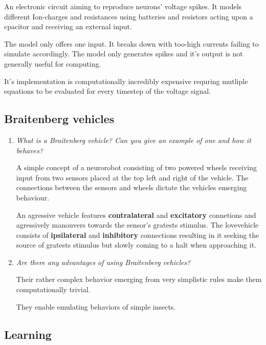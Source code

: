 \documentclass[
    fontsize      = 11pt,
    paper         = a4,
    twoside       = false,
    parskip       = half,
    pagesize      = false,
]{scrartcl}
\begin{document}
\begin{enumerate}
  An electronic circuit aiming to reproduce neurons' voltage spikes. It
  models different Ion-charges and resistances using batteries and
  resistors acting upon a cpacitor and receiving an external input.

  The model only offers one input. It breaks down with too-high currents
  failing to simulate accordingly. The model only generates spikes and
  it's output is not generally useful for computing.

  It's implementation is computationally incredibly expensive requring
  mutliple equations to be evaluated for every timestep of the voltage
  signal.
\end{enumerate}

\hypertarget{braitenberg-vehicles}{%
\subsection{Braitenberg vehicles}\label{braitenberg-vehicles}}

\begin{enumerate}
\def\labelenumi{\arabic{enumi}.}
\item
  \emph{What is a Braitenberg vehicle? Can you give an example of one
  and how it behaves?}

  A simple concept of a neurorobot consisting of two powered wheels
  receiving input from two sensors placed at the top left and right of
  the vehicle. The connections between the sensors and wheels dictate
  the vehicles emerging behaviour.

  An agressive vehicle features \textbf{contralateral} and
  \textbf{excitatory} connetions and agressively manouvers towards the
  sensor's gratests stimulus. The \glqq love\grqq vehicle consists of
  \textbf{ipsilateral} and \textbf{inhibitory} connections resulting in
  it seeking the source of gratests stimulus but slowly coming to a halt
  when approaching it.
\item
  \emph{Are there any advantages of using Braitenberg vehicles?}

  Their rather complex behavior emerging from very simplistic rules make
  them computationally trivial.

  They enable emulating behaviors of simple insects.
\end{enumerate}

\hypertarget{learning}{%
\subsection{Learning}\label{learning}}
\end{document}

